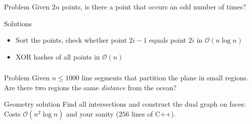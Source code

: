 \begin{frame}
    \frametitle{\problemtitle}
    \begin{block}{Problem}
	  Given $2n$ points, is there a point that occurs an odd number of times?
	\end{block}
	\pause
	\begin{block}{Solutions}
	  \begin{itemize}
	    \item Sort the points, check whether point $2i-1$ equals point $2i$ in $\mathcal O(n \log n)$
	    \item XOR hashes of all points in $\mathcal{O}(n)$
	  \end{itemize}
	\end{block}
\end{frame}

\begin{frame}
    \frametitle{\problemtitle}
    \begin{block}{Problem}
      Given $n\leq 1000$ line segments that partition the plane in small
      regions.
      Are there two regions the same \emph{distance} from the ocean?
    \end{block}
    \pause
    \begin{block}{Geometry solution}
      Find all intersections and construct the dual graph on faces:\\
      Costs $\mathcal{O}\left(n^2\log n\right)$ and your sanity ($256$ lines of C++).
    \end{block}
\end{frame}
